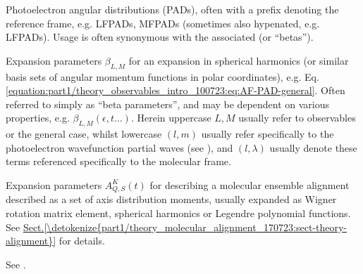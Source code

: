 \documentclass[letterpaper,table,10pt,english]{jupyterBook}
\begin{document}
\begin{description}
\sphinxAtStartPar
Photoelectron angular distributions (PADs), often with a prefix denoting the reference frame, e.g. LFPADs, MFPADs (sometimes also hypenated, e.g. LF\sphinxhyphen{}PADs). Usage is often synonymous with the associated {\hyperref[\detokenize{backmatter/glossary:term-anisotropy-paramters}]{}} (or “betas”).

\sphinxAtStartPar
Expansion parameters \(\beta_{L,M}\) for an expansion in spherical harmonics (or similar basis sets of angular momentum functions in polar coordinates), e.g. Eq. \eqref{equation:part1/theory_observables_intro_100723:eq:AF-PAD-general}. Often referred to simply as “beta parameters”, and may be dependent on various properties, e.g. \(\beta_{L,M}(\epsilon,t...)\). Herein upper\sphinxhyphen{}case \(L,M\) usually refer to observables or the general case, whilst lower\sphinxhyphen{}case \((l,m)\) usually refer specifically to the photoelectron wavefunction partial waves (see {\hyperref[\detokenize{backmatter/glossary:term-partial-wave-expansion}]{}}), and \((l,\lambda)\) usually denote these terms referenced specifically to the molecular frame.

\sphinxAtStartPar
Expansion parameters \(A_{Q,S}^{K}(t)\) for describing a molecular ensemble alignment described as a set of axis distribution moments, usually expanded as Wigner rotation matrix element, spherical harmonics or Legendre polynomial functions. See \hyperref[\detokenize{part1/theory_molecular_alignment_170723:sect-theory-alignment}]{Sect.\@ \ref{\detokenize{part1/theory_molecular_alignment_170723:sect-theory-alignment}}} for details.

\sphinxAtStartPar
See {\hyperref[\detokenize{backmatter/glossary:term-ADMs}]{}}.


\end{description}
\end{document}
